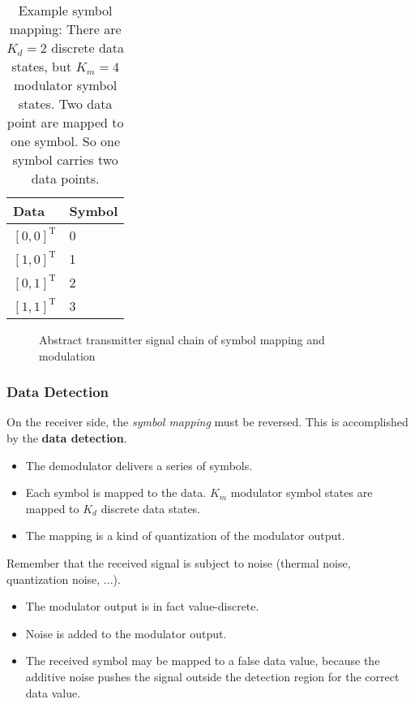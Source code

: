 \begin{refsection}
\begin{table}[H]
	\centering
	\caption[Example symbol mapping]{Example symbol mapping: There are $K_d = 2$ discrete data states, but $K_m = 4$ modulator symbol states. Two data point are mapped to one symbol. So one symbol carries two data points.}
	\begin{tabular}{|l|l|}
		\hline
		Data & Symbol \\
		\hline
		\hline
		$\left[0, 0\right]^{\mathrm{T}}$ & 0 \\
		\hline
		$\left[1, 0\right]^{\mathrm{T}}$ & 1 \\
		\hline
		$\left[0, 1\right]^{\mathrm{T}}$ & 2 \\
		\hline
		$\left[1, 1\right]^{\mathrm{T}}$ & 3 \\
		\hline
	\end{tabular}
\end{table}

\begin{figure}[H]
	\centering
	\caption{Abstract transmitter signal chain of symbol mapping and modulation}
\end{figure}

\subsubsection{Data Detection}

On the receiver side, the \emph{symbol mapping} must be reversed. This is accomplished by the  \textbf{data detection}.
\begin{itemize}
	\item The demodulator delivers a series of symbols.
	\item Each symbol is mapped to the data. $K_m$ modulator symbol states are mapped to $K_d$ discrete data states.
	\item The mapping is a kind of quantization of the modulator output.
\end{itemize}

Remember that the received signal is subject to noise (thermal noise, quantization noise, ...).
\begin{itemize}
	\item The modulator output is in fact value-discrete.
	\item Noise is added to the modulator output.
	\item The received symbol may be mapped to a false data value, because the additive noise pushes the signal outside the detection region for the correct data value.
\end{itemize}


\end{refsection}
